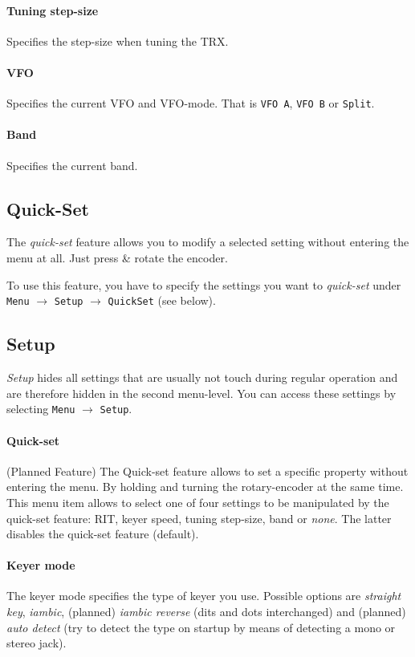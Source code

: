 \documentclass[10pt, a4paper]{scrartcl}
\begin{document}
\paragraph{Tuning step-size}
Specifies the step-size when tuning the TRX.

\paragraph{VFO}
Specifies the current VFO and VFO-mode. That is \texttt{VFO A}, \texttt{VFO B} or \texttt{Split}.

\paragraph{Band}
Specifies the current band. 


\subsection{Quick-Set}
The \emph{quick-set} feature allows you to modify a selected setting without entering the menu at all. Just press \& rotate the  encoder.

To use this feature, you have to specify the settings you want to \emph{quick-set} under \texttt{Menu} $\rightarrow$ \texttt{Setup} $\rightarrow$ \texttt{QuickSet} (see below).

\subsection{Setup}
\emph{Setup} hides all settings that are usually not touch during regular operation and are therefore hidden in the second menu-level. You can access these settings by selecting \texttt{Menu} $\rightarrow$ \texttt{Setup}.

\paragraph{Quick-set}
(Planned Feature) The Quick-set feature allows to set a specific property without entering the menu. By holding and turning the rotary-encoder at the same time. This menu item allows to select one of four settings to be manipulated by the quick-set feature: RIT, keyer speed, tuning step-size, band or \emph{none}. The latter disables the quick-set feature (default).

\paragraph{Keyer mode}
The keyer mode specifies the type of keyer you use. Possible options are \emph{straight key}, \emph{iambic}, (planned) \emph{iambic reverse} (dits and dots interchanged) and (planned) \emph{auto detect} (try to detect the type on startup by means of detecting a mono or stereo jack). 
\end{document}
